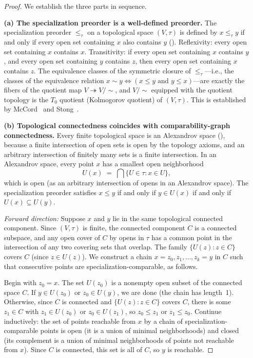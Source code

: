 \documentclass[11pt,a4paper]{article}
\theoremstyle{plain}
\theoremstyle{definition}
\begin{document}
\begin{proof}
We establish the three parts in sequence.

\medskip
\noindent
\textbf{(a) The specialization preorder is a well-defined preorder.}
The specialization preorder $\leq_\tau$ on a topological space $(V, \tau)$ is
defined by $x \leq_\tau y$ if and only if every open set containing $x$ also
contains $y$ ().  Reflexivity: every open set
containing $x$ contains $x$.  Transitivity: if every open set containing $x$
contains $y$, and every open set containing $y$ contains $z$, then every open
set containing $x$ contains $z$.  The equivalence classes of the symmetric
closure of $\leq_\tau$---i.e., the classes of the equivalence relation
$x \sim y \iff (x \leq y \text{ and } y \leq x)$---are exactly the fibers of
the quotient map $V \twoheadrightarrow V/{\sim}$, and $V/{\sim}$ equipped with
the quotient topology is the $T_0$ quotient (Kolmogorov quotient) of
$(V, \tau)$.  This is established by McCord~\cite{McCord1966} and
Stong~\cite{Stong1966}.

\medskip
\noindent
\textbf{(b) Topological connectedness coincides with comparability-graph connectedness.}
Every finite topological space is an Alexandrov space (),
because a finite intersection of open sets is open by the topology axioms, and
an arbitrary intersection of finitely many sets is a finite intersection.
In an Alexandrov space, every point $x$ has a smallest open neighborhood
\[
  U(x) \;=\; \bigcap\{U \in \tau : x \in U\},
\]
which is open (as an arbitrary intersection of opens in an Alexandrov space).
The specialization preorder satisfies $x \leq y$ if and only if $y \in U(x)$
if and only if $U(x) \subseteq U(y)$.

\emph{Forward direction:} Suppose $x$ and $y$ lie in the same topological
connected component.  Since $(V, \tau)$ is finite, the connected component
$C$ is a connected subspace, and any open cover of $C$ by opens in $\tau$ has
a common point in the intersection of any two covering sets that overlap.  The
family $\{U(z) : z \in C\}$ covers $C$ (since $z \in U(z)$).  We construct
a chain $x = z_0, z_1, \ldots, z_k = y$ in $C$ such that consecutive points
are specialization-comparable, as follows.

Begin with $z_0 = x$.  The set $U(z_0)$ is a nonempty open subset of the
connected space $C$.  If $y \in U(z_0)$ or $z_0 \in U(y)$, we are done (the
chain has length~1).  Otherwise, since $C$ is connected and $\{U(z) : z \in C\}$
covers $C$, there is some $z_1 \in C$ with $z_1 \in U(z_0)$ or
$z_0 \in U(z_1)$, so $z_0 \leq z_1$ or $z_1 \leq z_0$.  Continue
inductively: the set of points reachable from $x$ by a chain of
specialization-comparable points is open (it is a union of minimal
neighborhoods) and closed (its complement is a union of minimal neighborhoods
of points not reachable from $x$).  Since $C$ is connected, this set is all
of $C$, so $y$ is reachable.


\end{proof}
\end{document}
